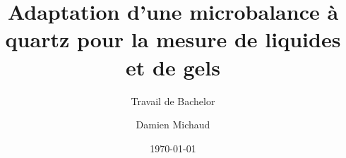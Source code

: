 \author{Damien Michaud}

\setfemale

\title{Adaptation d'une microbalance à quartz pour la mesure de liquides et de gels}

\subtitle{Travail de Bachelor}


\date{\today}


